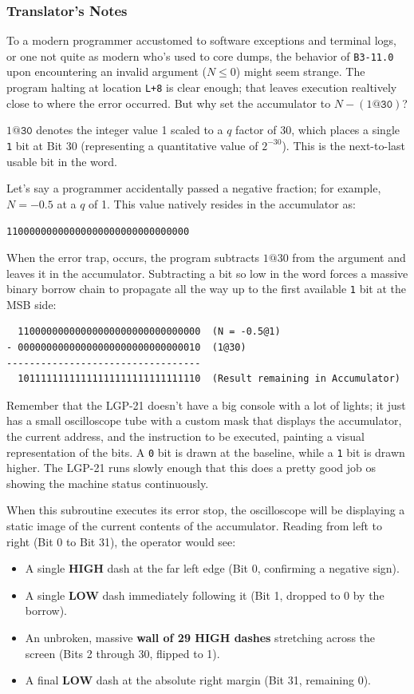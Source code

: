 \documentclass{article}
\begin{document}
\subsubsection*{Translator's Notes}
To a modern programmer accustomed to software exceptions and terminal logs, or one not quite as modern who's used to core dumps, the behavior of \texttt{B3-11.0} upon encountering an invalid argument ($N \le 0$) might seem strange. The program halting at location \texttt{L+8} is clear enough; that leaves execution realtively close to where the error occurred. But why set the accumulator to $N - (1\texttt{@30})$?

$1\texttt{@30}$ denotes the integer value 1 scaled to a $q$ factor of 30, which places a single \texttt{1} bit at Bit 30 (representing a quantitative value of $2^{-30}$). This is the next-to-last usable bit in the word.

Let's say a programmer accidentally passed a negative fraction; for example, $N = -0.5$ at a $q$ of 1. This value natively resides in the accumulator as:
\begin{center}
    \texttt{11000000000000000000000000000000}
\end{center}
\noindent
When the error trap, occurs, the program subtracts $1@30$ from the argument and leaves it in the accumulator. Subtracting a bit so low in the word forces a massive binary borrow chain to propagate all the way up to the first available \texttt{1} bit at the MSB side:
\begin{verbatim}
  11000000000000000000000000000000  (N = -0.5@1)
- 00000000000000000000000000000010  (1@30)
----------------------------------
  10111111111111111111111111111110  (Result remaining in Accumulator)
\end{verbatim}

Remember that the LGP-21 doesn't have a big console with a lot of lights; it just has a small oscilloscope tube with a custom mask that displays the accumulator, the current address, and the instruction to be executed, painting a visual representation of the bits. A \texttt{0} bit is drawn at the baseline, while a \texttt{1} bit is drawn higher. The LGP-21 runs slowly enough that this does a pretty good job os showing the machine status continuously.

When this subroutine executes its error stop, the oscilloscope will be displaying a static image of the current contents of the accumulator. Reading from left to right (Bit 0 to Bit 31), the operator would see:
\begin{itemize}
    \item A single \textbf{HIGH} dash at the far left edge (Bit 0, confirming a negative sign).
    \item A single \textbf{LOW} dash immediately following it (Bit 1, dropped to 0 by the borrow).
    \item An unbroken, massive \textbf{wall of 29 HIGH dashes} stretching across the screen (Bits 2 through 30, flipped to 1).
    \item A final \textbf{LOW} dash at the absolute right margin (Bit 31, remaining 0).
\end{itemize}
\end{document}

